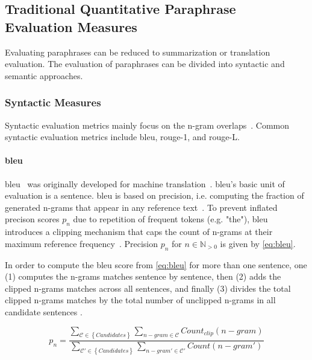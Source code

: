 \subsection{Traditional Quantitative Paraphrase Evaluation Measures}
\label{subsec:traditional_quantitative_evaluation_measures}

Evaluating paraphrases can be reduced to summarization or translation evaluation.
The evaluation of paraphrases can be divided into syntactic and semantic approaches. 

\subsubsection{Syntactic Measures}
Syntactic evaluation metrics mainly focus on the n-gram overlaps~\citep{zhou_paraphrase_2021}. 
Common syntactic evaluation metrics include \acs{bleu}, \acs{rouge}-1, and \acs{rouge}-L.

\paragraph{\ac{bleu}}
\ac{bleu}~\citep{papineni_bleu_2001} was originally developed for machine translation~\citep{zhou_paraphrase_2021}. 
\ac{bleu}'s basic unit of evaluation is a sentence. 
\ac{bleu} is based on precision, i.e. computing the fraction of generated n-grams that appear in any reference text~\citep{kurt_pehlivanoglu_comparative_2024,palivela_optimization_2021,papineni_bleu_2001}. 
To prevent inflated precison scores $p_n$ due to repetition of frequent tokens (e.g. "the"), \ac{bleu} introduces a clipping mechanism that caps the count of n-grams at their maximum reference frequency~\citep{papineni_bleu_2001}. 
Precision $p_n$ for $n \in \mathbb{N}_{>0}$ is given by \autoref{eq:bleu}.

In order to compute the \ac{bleu} score from \autoref{eq:bleu} for more than one sentence, 
one (1) computes the n-grams matches sentence by sentence, 
then (2) adds the clipped n-grams matches across all sentences, 
and finally (3) divides the total clipped n-grams matches by 
the total number of unclipped n-grams in all candidate sentences \citep{papineni_bleu_2001}.

\begin{equation}
    p_n = \frac{\sum_{\mathcal{C} \in \left\{ Candidates \right\}}\sum_{n-gram \in\mathcal{C}}Count_{clip}(n-gram)}{\sum_{\mathcal{C'} \in \left\{ Candidates \right\}}\sum_{n-gram' \in\mathcal{C'}}Count(n-gram')}
\label{eq:bleu}
\end{equation}

